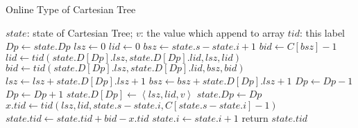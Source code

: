 \begin{algorithm}[!thb]
  \caption{Online Type of Cartesian Tree}
  \label{alg:cartesian-encode-online}
  \begin{algorithmic}[1]
  \Require
      $\mathit{state}$: state of Cartesian Tree;
      $v$: the value which append to array
  \Ensure
      $\mathit{tid}$: this label
  \State $\textit{Dp} \gets \textit{state}.\textit{Dp}$
  \State $\textit{lsz} \gets 0$ 
  \State $\textit{lid} \gets 0$
  \State $\textit{bsz} \gets \textit{state}.\textit{s} - \textit{state}.\textit{i} + 1$
  \State $\textit{bid} \gets C[\textit{bsz}] - 1$
    \State $\textit{lid} \gets \textit{tid}(\textit{state}.D[\textit{Dp}].\textit{lsz}, \textit{state}.D[\textit{Dp}].\textit{lid}, \textit{lsz}, \textit{lid})$
    \State $\textit{bid} \gets \textit{tid}(\textit{state}.D[\textit{Dp}].\textit{lsz}, \textit{state}.D[\textit{Dp}].\textit{lid}, \textit{bsz}, \textit{bid})$
    \State $\textit{lsz} \gets \textit{lsz} + \textit{state}.D[\textit{Dp}].\textit{lsz}+1$
    \State $\textit{bsz} \gets \textit{bsz} + \textit{state}.D[\textit{Dp}].\textit{lsz}+1$
    \State $\textit{Dp} \gets \textit{Dp} - 1$
  \EndWhile
  \State $\textit{Dp} \gets \textit{Dp} + 1$
  \State $\textit{state}.D[\textit{Dp}] \gets \left \langle \textit{lsz}, \textit{lid}, \textit{v} \right \rangle$
  \State $\textit{state}.\textit{Dp} \gets \textit{Dp}$
  \State $x.\textit{tid} \gets \textit{tid}(\textit{lsz}, \textit{lid}, \textit{state}.s-\textit{state}.i, C[\textit{state}.s-\textit{state}.i]-1)$
  \State $\textit{state}.\textit{tid} \gets \textit{state}.\textit{tid} + \textit{bid} - x.\textit{tid}$
  \State $\textit{state}.i \gets \textit{state}.i + 1$
  \State return $\textit{state}.\textit{tid}$
  \end{algorithmic}
\end{algorithm}